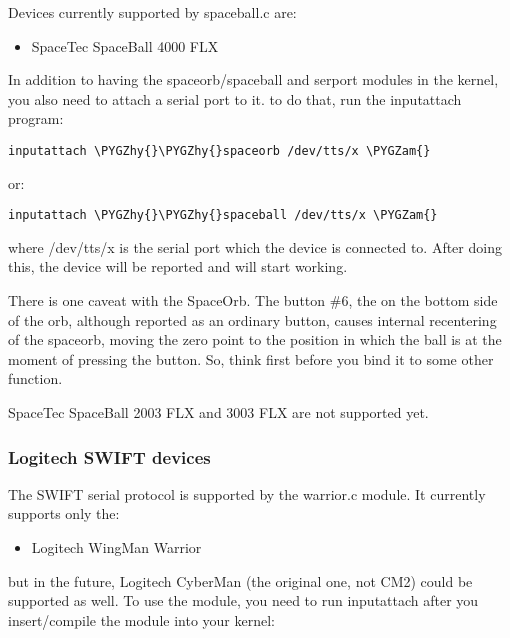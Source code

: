 \documentclass[a4paper,8pt,english]{sphinxmanual}
\def\PYGZam{\char`\&}
\def\PYGZhy{\char`\-}
\begin{document}
Devices currently supported by spaceball.c are:
\begin{itemize}
\item {} 
SpaceTec SpaceBall 4000 FLX

\end{itemize}

In addition to having the spaceorb/spaceball and serport modules in the
kernel, you also need to attach a serial port to it. to do that, run the
inputattach program:

\begin{Verbatim}[commandchars=\\\{\}]
inputattach \PYGZhy{}\PYGZhy{}spaceorb /dev/tts/x \PYGZam{}
\end{Verbatim}

or:

\begin{Verbatim}[commandchars=\\\{\}]
inputattach \PYGZhy{}\PYGZhy{}spaceball /dev/tts/x \PYGZam{}
\end{Verbatim}

where /dev/tts/x is the serial port which the device is connected to. After
doing this, the device will be reported and will start working.

There is one caveat with the SpaceOrb. The button \#6, the on the bottom
side of the orb, although reported as an ordinary button, causes internal
recentering of the spaceorb, moving the zero point to the position in which
the ball is at the moment of pressing the button. So, think first before
you bind it to some other function.

SpaceTec SpaceBall 2003 FLX and 3003 FLX are not supported yet.


\subsubsection{Logitech SWIFT devices}
\label{input/joydev/joystick:logitech-swift-devices}
The SWIFT serial protocol is supported by the warrior.c module. It
currently supports only the:
\begin{itemize}
\item {} 
Logitech WingMan Warrior

\end{itemize}

but in the future, Logitech CyberMan (the original one, not CM2) could be
supported as well. To use the module, you need to run inputattach after you
insert/compile the module into your kernel:
\end{document}
